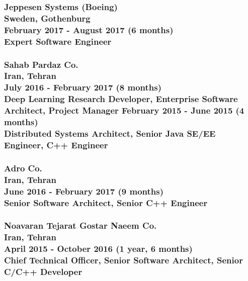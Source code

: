 \documentclass[10pt,a4paper]{article}
\begin{document}
\subsubsection{{ \textbullet \hspace{0.1cm} \large Jeppesen Systems (Boeing)} \\
\textnormal{Sweden, Gothenburg} \\
\textnormal{February 2017 - August 2017 (6 months)} \\
{Expert Software Engineer}} \hfill

\subsubsection{{ \textbullet \hspace{0.1cm} \large Sahab Pardaz Co.} \\
\textnormal{Iran, Tehran} \\
\textnormal{July 2016 - February 2017 (8 months)} \\
{Deep Learning Research Developer, Enterprise Software Architect, Project Manager}
\textnormal{February 2015 - June 2015 (4 months)} \\
{Distributed Systems Architect, Senior Java SE/EE Engineer, C++ Engineer}}
\vspace{0.3cm}

\subsubsection{{ \textbullet \hspace{0.1cm} \large Adro Co.} \\
\textnormal{Iran, Tehran} \\
\textnormal{June 2016 - February 2017 (9 months)} \\
{Senior Software Architect, Senior C++ Engineer}}
\vspace{0.3cm}

\subsubsection{{ \textbullet \hspace{0.1cm} \large Noavaran Tejarat Gostar Naeem Co.} \\
\textnormal{Iran, Tehran} \\
\textnormal{April 2015 - October 2016 (1 year, 6 months)} \\
{Chief Technical Officer, Senior Software Architect, Senior C/C++ Developer}}
\vspace{0.3cm}
\end{document}
